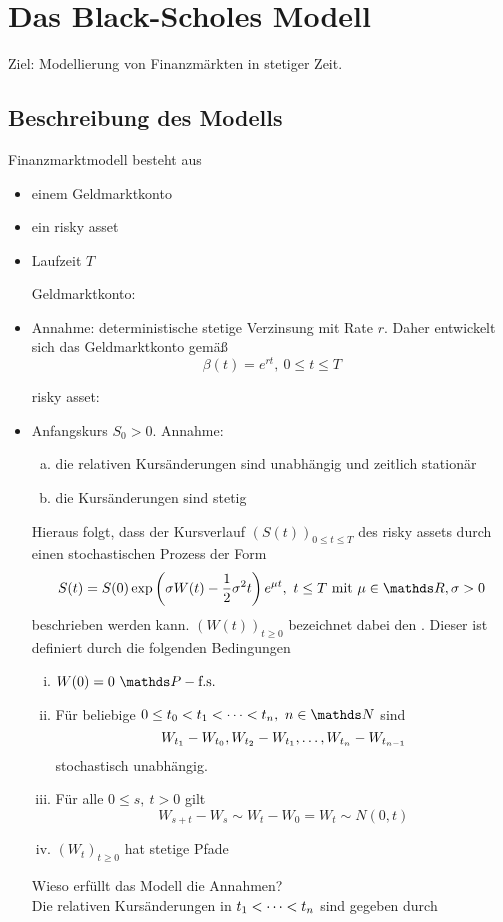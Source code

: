 \section{Das Black-Scholes Modell}
\label{sec:black_scholes_modell}
Ziel: Modellierung von Finanzmärkten in stetiger Zeit.

\subsection{Beschreibung des Modells}
\label{sub:beschreibung_des_modells}
Finanzmarktmodell besteht aus
\begin{itemize}
	\item einem Geldmarktkonto
	\item ein risky asset
	\item Laufzeit $T$
	\item[Geldmarktkonto:]
	\item Annahme: deterministische stetige Verzinsung mit Rate $r$.
	Daher entwickelt sich das Geldmarktkonto gemäß
	\[
	\beta(t)=e^{rt},~0\le t\le T
	\]
	\item[risky asset:]
	\item Anfangskurs $S_0>0$. Annahme:
	\begin{enumerate}[(a)]
		\item die relativen Kursänderungen sind unabhängig und zeitlich stationär
		\item die Kursänderungen sind stetig
	\end{enumerate} 
	Hieraus folgt, dass der Kursverlauf $(S(t))_{0\le t\le T}$ des risky assets durch einen stochastischen Prozess der Form
	\[
	S(t)=S(0)\exp\enbrace{\sigma W(t)-\frac{1}{2}\sigma^2t}e^{\mu t},~t\le T\text{ mit } \mu\in \R,\sigma>0
	\]
	beschrieben werden kann. $(W(t))_{t\ge 0}$ bezeichnet dabei den . Dieser ist definiert durch die folgenden Bedingungen
	\begin{enumerate}[(i)]
		\item $W(0)=0~\pfs$
		\item Für beliebige $0\le t_0<t_1\dt{<}t_n,~n\in \N$ sind 
		\[
		W_{t_1}-W_{t_0},W_{t_2}-W_{t_1}, \dots ,W_{t_n}-W_{t_{n-1}}
		\]
		stochastisch unabhängig.
		\item Für alle $0\le s,~t>0$ gilt
		\[
		W_{s+t}-W_s\sim W_t-W_0=W_t\sim N(0,t)
		\]
		\item $(W_t)_{t\ge0}$ hat stetige Pfade
	\end{enumerate}
	Wieso erfüllt das Modell die Annahmen?\\
	Die relativen Kursänderungen in $t_1< \dots <t_n$ sind gegeben durch

\end{itemize}
